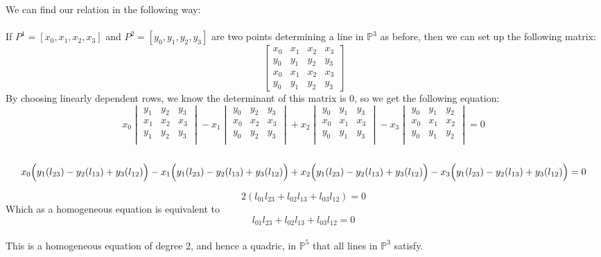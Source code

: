 \documentclass{article}
\begin{document}
We can find our relation in the following way:\\
\\
If $P^1=[x_0,x_1,x_2,x_3]$ and $P^2=[y_0,y_1,y_2,y_3]$ are two points determining a line in $\mathbb{P}^3$ as before, then we can set up the following matrix:\\
$$
\begin{bmatrix}
    x_0 & x_1 & x_2 & x_3 \\
    y_0 & y_1 & y_2 & y_3 \\ 
    x_0 & x_1 & x_2 & x_3 \\
    y_0 & y_1 & y_2 & y_3  
\end{bmatrix}
$$
By choosing linearly dependent rows, we know the determinant of this matrix is 0, so we get the following equation:\\
$$
x_0\begin{vmatrix}
    y_1 & y_2 & y_3\\
    x_1 & x_2 & x_3\\
    y_1 & y_2 & y_3\\
\end{vmatrix}-x_1\begin{vmatrix}
    y_0 & y_2 & y_3\\
    x_0 & x_2 & x_3\\
    y_0 & y_2 & y_3\\
\end{vmatrix}+ x_2\begin{vmatrix}
    y_0 & y_1 & y_3\\
    x_0 & x_1 & x_3\\
    y_0 & y_1 & y_3\\
\end{vmatrix} - x_3\begin{vmatrix}
    y_0 & y_1 & y_2\\
    x_0 & x_1 & x_2\\
    y_0 & y_1 & y_2\\
\end{vmatrix} = 0
$$\\
$$
x_0\Bigl ( y_1(l_{23})-y_2(l_{13})+y_3(l_{12})\Bigr )-x_1\Bigl ( y_1(l_{23})-y_2(l_{13})+y_3(l_{12})\Bigr ) +x_2\Bigl ( y_1(l_{23})-y_2(l_{13})+y_3(l_{12})\Bigr ) -x_3\Bigl ( y_1(l_{23})-y_2(l_{13})+y_3(l_{12})\Bigr )=0
$$

$$
2(l_{01}l_{23} + l_{02}l_{13}+l_{03}l_{12})=0
$$
Which as a homogeneous equation is equivalent to 
$$
l_{01}l_{23} + l_{02}l_{13}+l_{03}l_{12}=0
$$\\
This is a homogeneous equation of degree 2, and hence a quadric, in $\mathbb{P}^5$ that all lines in $\mathbb{P}^3$ satisfy.
\end{document}

